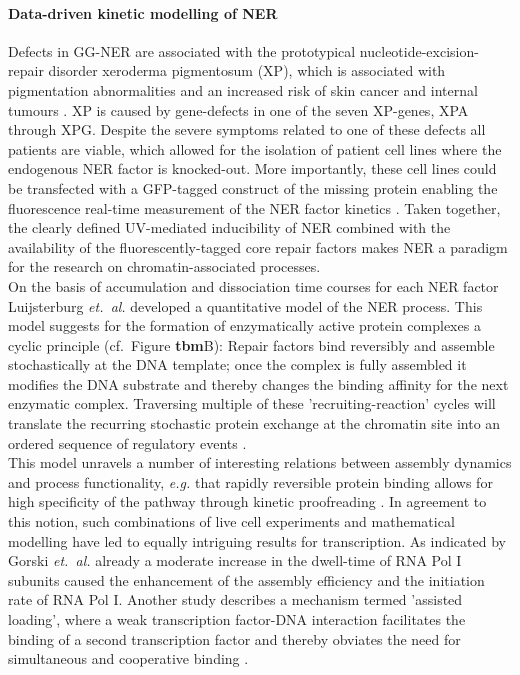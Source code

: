 \paragraph{Data-driven kinetic modelling of NER}
Defects in GG-NER are associated with the prototypical nucleotide-excision-repair disorder xeroderma pigmentosum (XP), which is associated with pigmentation abnormalities and an increased risk of skin cancer and internal tumours \cite{Hoeijmakers2009}. XP is caused by gene-defects in one of the seven XP-genes, XPA through XPG. Despite the severe symptoms related to one of these defects all patients are viable, which allowed for the isolation of patient cell lines where the endogenous NER factor is knocked-out. More importantly, these cell lines could be transfected with a GFP-tagged construct of the missing protein enabling the fluorescence real-time measurement of the NER factor kinetics \cite{Hoogstraten2002,Hoogstraten2008,Zotter2006,Rademakers2003}. Taken together, the clearly defined UV-mediated inducibility of NER combined with the availability of the fluorescently-tagged core repair factors makes NER a paradigm for the research on chromatin-associated processes.\\
On the basis of accumulation and dissociation time courses for each NER factor Luijsterburg \textit{et.\ al.}\cite{Luijsterburg2010} developed a quantitative model of the NER process. This model suggests for the formation of enzymatically active protein complexes a cyclic principle (cf.\ Figure \textbf{tbm}B): Repair factors bind reversibly and assemble stochastically at the DNA template; once the complex is fully assembled it modifies the DNA substrate and thereby changes the binding affinity for the next enzymatic complex. Traversing multiple of these 'recruiting-reaction' cycles will translate the recurring stochastic protein exchange at the chromatin site into an ordered sequence of regulatory events \cite{Dinant:2009:J-Cell-Biol:19332890}.\\
This model unravels a number of interesting relations between assembly dynamics and process functionality, \textit{e.g.} that rapidly reversible protein binding allows for high specificity of the pathway through kinetic proofreading \cite{Luijsterburg2010}. In agreement to this notion, such combinations of live cell experiments and mathematical modelling have led to equally intriguing results for transcription. As indicated by Gorski \textit{et.\ al.} \cite{Gorski:2008:Mol-Cell:18498750} already a moderate increase in the dwell-time of RNA Pol I subunits caused the enhancement of the assembly efficiency and the initiation rate of RNA Pol I. Another study describes a mechanism termed 'assisted loading', where a weak transcription factor-DNA interaction facilitates the binding of a second transcription factor and thereby obviates the need for simultaneous and cooperative binding \cite{Voss2011}. \\         
